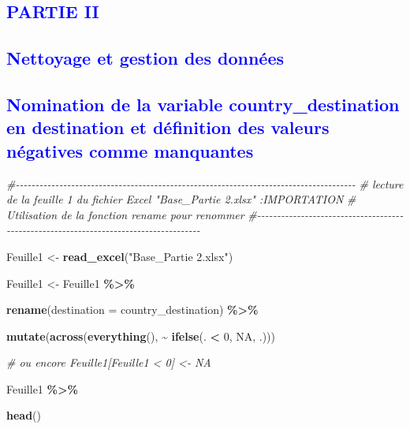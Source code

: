 \documentclass[
]{article}
\newenvironment{Shaded}{\begin{snugshade}}{\end{snugshade}}
\newcommand{\AttributeTok}[1]{\textcolor[rgb]{0.13,0.29,0.53}{#1}}
\newcommand{\CommentTok}[1]{\textcolor[rgb]{0.56,0.35,0.01}{\textit{#1}}}
\newcommand{\ConstantTok}[1]{\textcolor[rgb]{0.56,0.35,0.01}{#1}}
\newcommand{\DecValTok}[1]{\textcolor[rgb]{0.00,0.00,0.81}{#1}}
\newcommand{\FunctionTok}[1]{\textcolor[rgb]{0.13,0.29,0.53}{\textbf{#1}}}
\newcommand{\NormalTok}[1]{#1}
\newcommand{\OtherTok}[1]{\textcolor[rgb]{0.56,0.35,0.01}{#1}}
\newcommand{\SpecialCharTok}[1]{\textcolor[rgb]{0.81,0.36,0.00}{\textbf{#1}}}
\newcommand{\StringTok}[1]{\textcolor[rgb]{0.31,0.60,0.02}{#1}}
\begin{document}
\newpage

\textcolor{blue}{\section*{PARTIE II}}

\textcolor{blue}{\section{Nettoyage et gestion des données}}

\textcolor{blue}{\subsection{ Nomination de la variable country\_destination en destination et définition des valeurs négatives
comme manquantes}}

\begin{Shaded}
\begin{Highlighting}[]
\CommentTok{\#{-}{-}{-}{-}{-}{-}{-}{-}{-}{-}{-}{-}{-}{-}{-}{-}{-}{-}{-}{-}{-}{-}{-}{-}{-}{-}{-}{-}{-}{-}{-}{-}{-}{-}{-}{-}{-}{-}{-}{-}{-}{-}{-}{-}{-}{-}{-}{-}{-}{-}{-}{-}{-}{-}{-}{-}{-}{-}{-}{-}{-}{-}{-}{-}{-}{-}{-}{-}{-}{-}{-}{-}{-}{-}{-}{-}{-}{-}{-}{-}{-}{-}{-}{-}{-}{-}}
\CommentTok{\# lecture de la feuille 1 du fichier Excel "Base\_Partie 2.xlsx" :IMPORTATION  }
\CommentTok{\# Utilisation de la fonction rename pour renommer }
\CommentTok{\#{-}{-}{-}{-}{-}{-}{-}{-}{-}{-}{-}{-}{-}{-}{-}{-}{-}{-}{-}{-}{-}{-}{-}{-}{-}{-}{-}{-}{-}{-}{-}{-}{-}{-}{-}{-}{-}{-}{-}{-}{-}{-}{-}{-}{-}{-}{-}{-}{-}{-}{-}{-}{-}{-}{-}{-}{-}{-}{-}{-}{-}{-}{-}{-}{-}{-}{-}{-}{-}{-}{-}{-}{-}{-}{-}{-}{-}{-}{-}{-}{-}{-}{-}{-}{-}{-}}

\NormalTok{Feuille1 }\OtherTok{\textless{}{-}} \FunctionTok{read\_excel}\NormalTok{(}\StringTok{"Base\_Partie 2.xlsx"}\NormalTok{)}

\NormalTok{Feuille1 }\OtherTok{\textless{}{-}}\NormalTok{ Feuille1 }\SpecialCharTok{\%\textgreater{}\%}
  
\FunctionTok{rename}\NormalTok{(}\AttributeTok{destination =}\NormalTok{ country\_destination) }\SpecialCharTok{\%\textgreater{}\%}
  
\FunctionTok{mutate}\NormalTok{(}\FunctionTok{across}\NormalTok{(}\FunctionTok{everything}\NormalTok{(), }\SpecialCharTok{\textasciitilde{}} \FunctionTok{ifelse}\NormalTok{(. }\SpecialCharTok{\textless{}} \DecValTok{0}\NormalTok{, }\ConstantTok{NA}\NormalTok{, .)))}

\CommentTok{\# ou encore Feuille1[Feuille1 \textless{} 0] \textless{}{-} NA}

\NormalTok{Feuille1 }\SpecialCharTok{\%\textgreater{}\%}
  
  \FunctionTok{head}\NormalTok{()}
\end{Highlighting}
\end{Shaded}
\end{document}
